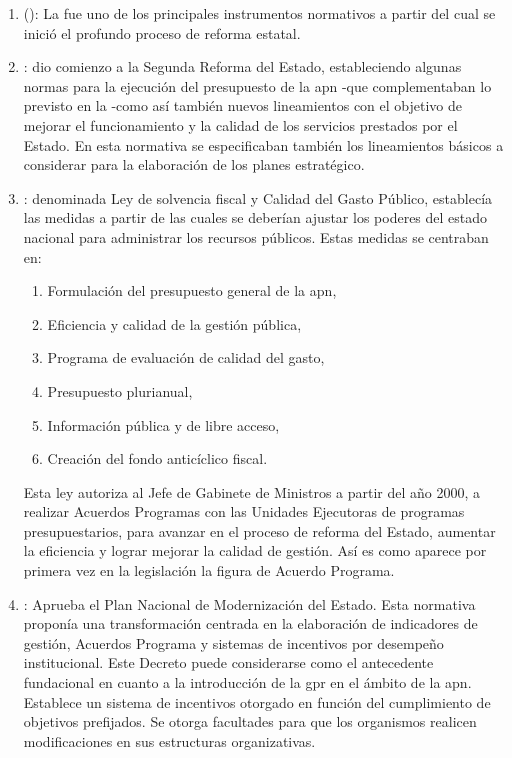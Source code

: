     \begin{enumerate}
        \item \citeauthor{ley24156} (\citeyear{ley24156}): La  fue uno de los principales instrumentos normativos a partir del cual se inició el profundo proceso de reforma estatal.
        \item \textcite{ley24629}: dio comienzo a la Segunda Reforma del Estado, estableciendo algunas normas para la ejecución del presupuesto de la \ac{apn} -que complementaban lo previsto en la \citeauthor{ley24156} -como así también nuevos lineamientos con el objetivo de mejorar el funcionamiento y la calidad de los servicios prestados por el Estado. En esta normativa se especificaban también los lineamientos básicos a considerar para la elaboración de los planes estratégico.
        \item \textcite{ley25512}: denominada Ley de solvencia fiscal y Calidad del Gasto Público, establecía las medidas a partir de las cuales se deberían ajustar los poderes del estado nacional para administrar los recursos públicos. Estas medidas se centraban en:
            \begin{enumerate}
                \item Formulación del presupuesto general de la \ac{apn},
                \item Eficiencia y calidad de la gestión pública,
                \item Programa de evaluación de calidad del gasto,
                \item Presupuesto plurianual,
                \item Información pública y de libre acceso,
                \item Creación del fondo anticíclico fiscal.
            \end{enumerate}
        Esta ley autoriza al Jefe de Gabinete de Ministros a partir del año 2000, a realizar Acuerdos Programas con las Unidades Ejecutoras de programas presupuestarios, para avanzar en el proceso de reforma del Estado, aumentar la eficiencia y lograr mejorar la calidad de gestión. Así es como aparece por primera vez en la legislación la figura de Acuerdo Programa.
        \item \textcite{decreto103}: Aprueba el Plan Nacional de Modernización del Estado. Esta normativa proponía una transformación centrada en la elaboración de indicadores de gestión, Acuerdos Programa y sistemas de incentivos por desempeño institucional. Este Decreto puede considerarse como el antecedente fundacional en cuanto a la introducción de la \ac{gpr} en el ámbito de la \ac{apn}. Establece un sistema de incentivos otorgado en función del cumplimiento de objetivos prefijados. Se otorga facultades para que los organismos realicen modificaciones en sus estructuras organizativas.
    \end{enumerate}	

